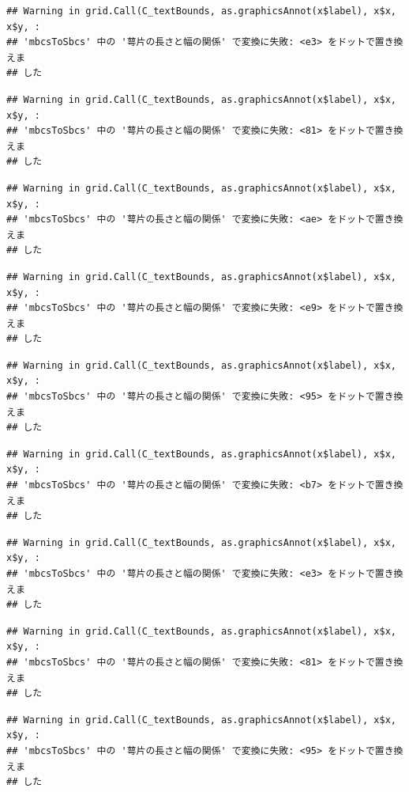 \documentclass[
]{book}
\begin{document}
\begin{verbatim}
## Warning in grid.Call(C_textBounds, as.graphicsAnnot(x$label), x$x, x$y, :
## 'mbcsToSbcs' 中の '萼片の長さと幅の関係' で変換に失敗: <e3> をドットで置き換えま
## した
\end{verbatim}

\begin{verbatim}
## Warning in grid.Call(C_textBounds, as.graphicsAnnot(x$label), x$x, x$y, :
## 'mbcsToSbcs' 中の '萼片の長さと幅の関係' で変換に失敗: <81> をドットで置き換えま
## した
\end{verbatim}

\begin{verbatim}
## Warning in grid.Call(C_textBounds, as.graphicsAnnot(x$label), x$x, x$y, :
## 'mbcsToSbcs' 中の '萼片の長さと幅の関係' で変換に失敗: <ae> をドットで置き換えま
## した
\end{verbatim}

\begin{verbatim}
## Warning in grid.Call(C_textBounds, as.graphicsAnnot(x$label), x$x, x$y, :
## 'mbcsToSbcs' 中の '萼片の長さと幅の関係' で変換に失敗: <e9> をドットで置き換えま
## した
\end{verbatim}

\begin{verbatim}
## Warning in grid.Call(C_textBounds, as.graphicsAnnot(x$label), x$x, x$y, :
## 'mbcsToSbcs' 中の '萼片の長さと幅の関係' で変換に失敗: <95> をドットで置き換えま
## した
\end{verbatim}

\begin{verbatim}
## Warning in grid.Call(C_textBounds, as.graphicsAnnot(x$label), x$x, x$y, :
## 'mbcsToSbcs' 中の '萼片の長さと幅の関係' で変換に失敗: <b7> をドットで置き換えま
## した
\end{verbatim}

\begin{verbatim}
## Warning in grid.Call(C_textBounds, as.graphicsAnnot(x$label), x$x, x$y, :
## 'mbcsToSbcs' 中の '萼片の長さと幅の関係' で変換に失敗: <e3> をドットで置き換えま
## した
\end{verbatim}

\begin{verbatim}
## Warning in grid.Call(C_textBounds, as.graphicsAnnot(x$label), x$x, x$y, :
## 'mbcsToSbcs' 中の '萼片の長さと幅の関係' で変換に失敗: <81> をドットで置き換えま
## した
\end{verbatim}

\begin{verbatim}
## Warning in grid.Call(C_textBounds, as.graphicsAnnot(x$label), x$x, x$y, :
## 'mbcsToSbcs' 中の '萼片の長さと幅の関係' で変換に失敗: <95> をドットで置き換えま
## した
\end{verbatim}
\end{document}
